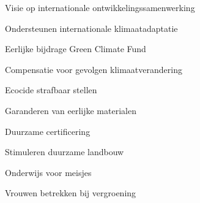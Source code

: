 
\begin{voorstel}{Visie op internationale ontwikkelingssamenwerking}\end{voorstel}

\begin{voorstel}{Ondersteunen internationale klimaatadaptatie}\end{voorstel}
\begin{voorstel}{Eerlijke bijdrage Green Climate Fund}\end{voorstel}
\begin{voorstel}{Compensatie voor gevolgen klimaatverandering}\end{voorstel}
\begin{voorstel}{Ecocide strafbaar stellen}\end{voorstel}
\begin{voorstel}{Garanderen van eerlijke materialen}\end{voorstel}
\begin{voorstel}{Duurzame certificering}\end{voorstel}
\begin{voorstel}{Stimuleren duurzame landbouw}\end{voorstel}
\begin{voorstel}{Onderwijs voor meisjes}\end{voorstel}
\begin{voorstel}{Vrouwen betrekken bij vergroening}\end{voorstel}
